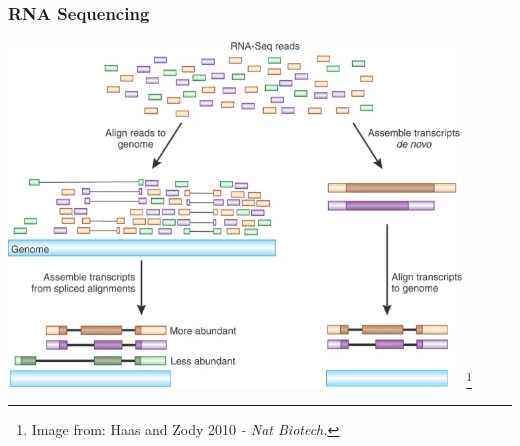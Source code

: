 \documentclass{beamer}
\newcommand\blfootnote[1]{%
	\begingroup
	\renewcommand\thefootnote{}\footnote{#1}%
	\addtocounter{footnote}{-1}%
	\endgroup
}
\begin{document}
\begin{frame}
	\frametitle{RNA Sequencing}
	\centering	\includegraphics[keepaspectratio, width  = 0.9\textwidth]{img/rnaReadAlignment}
	\blfootnote{Image from: Haas and Zody 2010 \textit{- Nat Biotech.}}
\end{frame}
\end{document}
